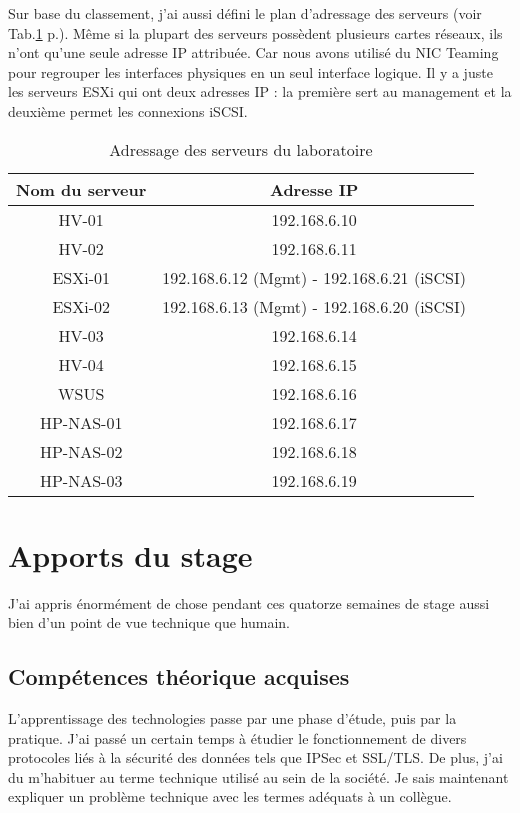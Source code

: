 Sur base du classement, j'ai aussi défini le plan d'adressage des serveurs (voir Tab.\ref{tab:addIP} p.\pageref{tab:addIP}).
Même si la plupart des serveurs possèdent plusieurs cartes réseaux, ils n'ont qu'une seule adresse IP attribuée.
Car nous avons utilisé du NIC Teaming pour regrouper les interfaces physiques en un seul interface logique.
Il y a juste les serveurs ESXi qui ont deux adresses IP : la première sert au management et la deuxième permet les connexions iSCSI.
\begin{table}
\centering
\begin{tabular}{cc}
\toprule
Nom du serveur & Adresse IP \\
\midrule
HV-01 & 192.168.6.10 \\ 
HV-02 & 192.168.6.11 \\ 
ESXi-01 & 192.168.6.12 (Mgmt) - 192.168.6.21 (iSCSI) \\ 
ESXi-02 & 192.168.6.13 (Mgmt) - 192.168.6.20 (iSCSI) \\ 
HV-03 & 192.168.6.14 \\ 
HV-04 & 192.168.6.15 \\ 
WSUS & 192.168.6.16 \\ 
HP-NAS-01 & 192.168.6.17 \\ 
HP-NAS-02 & 192.168.6.18 \\ 
HP-NAS-03 & 192.168.6.19 \\
\bottomrule
\end{tabular}
\caption{Adressage des serveurs du laboratoire}
\label{tab:addIP}
\end{table}


\section{Apports du stage}
J'ai appris énormément de chose pendant ces quatorze semaines de stage aussi bien d'un point de vue technique que humain.

\subsection{Compétences théorique acquises}
L'apprentissage des technologies passe par une phase d'étude, puis par la pratique.
J'ai passé un certain temps à étudier le fonctionnement de divers protocoles liés à la sécurité des données tels que IPSec et SSL/TLS.
De plus, j'ai du m'habituer au terme technique utilisé au sein de la société.
Je sais maintenant expliquer un problème technique avec les termes adéquats à un collègue.

